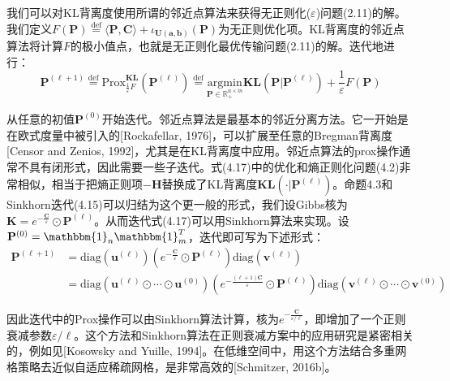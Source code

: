 \documentclass[cn,10pt,math=newtx,citestyle=gb7714-2015,bibstyle=gb7714-2015]{elegantbook}
\begin{document}
\begin{postulate}[邻近点算法]
我们可以对KL背离度使用所谓的邻近点算法来获得无正则化($\varepsilon$)问题(2.11)的解。我们定义$F(\mathbf{P})\overset{\text{def}}{=}\langle \mathbf{P,C} \rangle + \iota_{\mathbf{U(a,b)}}(\mathbf{P})$为无正则优化项。KL背离度的邻近点算法将计算$F$的极小值点，也就是无正则化最优传输问题(2.11)的解。迭代地进行：
\begin{equation}
    \label{4.17}
    \mathbf{P}^{(\ell +1)}\overset{\text{def}}{=} \text{Prox}^{\mathbf{KL}}_{\frac{1}{\varepsilon}F}(\mathbf{P}^{(\ell)}) \overset{\text{def}}{=} \text{argmin}\limits_{\mathbf{P}\in\mathbb{R}_+^{n\times m}}\mathbf{KL}(\mathbf{P}|\mathbf{P}^{(\ell)})+\frac{1}{\varepsilon}F(\mathbf{P})
\end{equation}

从任意的初值$\mathbf{P}^{(0)}$开始迭代。邻近点算法是最基本的邻近分离方法。它一开始是在欧式度量中被引入的[Rockafellar, 1976]，可以扩展至任意的Bregman背离度[Censor and Zenios, 1992]，尤其是在KL背离度中应用。邻近点算法的prox操作通常不具有闭形式，因此需要一些子迭代。式(4.17)中的优化和熵正则化问题(4.2)非常相似，相当于把熵正则项$-\mathbf{H}$替换成了KL背离度$\mathbf{KL}(\cdot|\mathbf{P}^{(\ell)})$。命题4.3和Sinkhorn迭代(4.15)可以归结为这个更一般的形式，我们设Gibbs核为$\mathbf{K}=e^{-\frac{\mathbf{C}}{\varepsilon}}\odot \mathbf{P}^{(\ell)}$。从而迭代式(4.17)可以用Sinkhorn算法来实现。设$\mathbf{P}^{(0)}=\mathbbm{1}_n\mathbbm{1}_m^T$，迭代即可写为下述形式：
\begin{align*}
    \mathbf{P}^{(\ell+1)} &= \text{diag}(\mathbf{u}^{(\ell)})(e^{-\frac{\mathbf{C}}{\varepsilon}}\odot \mathbf{P}^{(\ell)})\text{diag}(\mathbf{v}^{(\ell)})\\
    &= \text{diag}(\mathbf{u}^{(\ell)}\odot \cdots \odot \mathbf{u}^{(0)})(e^{-\frac{(\ell+1)\mathbf{C}}{\varepsilon}}\odot \mathbf{P}^{(\ell)})\text{diag}(\mathbf{v}^{(\ell)}\odot \cdots \odot \mathbf{v}^{(0)})
\end{align*}

因此迭代中的Prox操作可以由Sinkhorn算法计算，核为$e^{-\frac{\mathbf{C}}{\varepsilon/\ell}}$，即增加了一个正则衰减参数$\varepsilon/\ell$。这个方法和Sinkhorn算法在正则衰减方案中的应用研究是紧密相关的，例如见[Kosowsky and Yuille, 1994]。在低维空间中，用这个方法结合多重网格策略去近似自适应稀疏网格，是非常高效的[Schmitzer, 2016b]。
\end{postulate}
\end{document}
